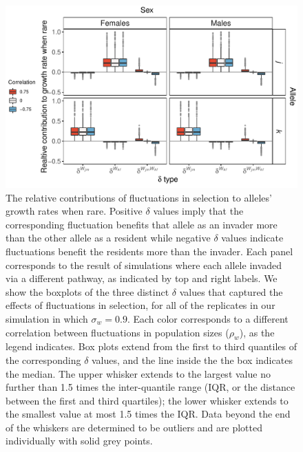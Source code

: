 \documentclass[12pt]{article}
\begin{document}
\begin{figure}[H]
  \centerline{\includegraphics[]{box_plots_selection.pdf}}
  \caption{The relative contributions of fluctuations in selection to alleles' growth rates when rare. Positive $\delta$ values imply that the corresponding fluctuation benefits that allele as an invader more than the other allele as a resident while negative $\delta$ values indicate fluctuations benefit the residents more than the invader. Each panel corresponds to the result of simulations where each allele invaded via a different pathway, as indicated by top and right labels. We show the boxplots of the three distinct $\delta$ values that captured the effects of fluctuations in selection, for all of the replicates in our simulation in which $\sigma_{w}=0.9$. Each color corresponds to a different correlation between fluctuations in population sizes ($\rho_{w}$), as the legend indicates. Box plots extend from the first to third quantiles of the corresponding $\delta$ values, and the line inside the the box indicates the median. The upper whisker extends to the largest value no further than 1.5 times the inter-quantile range (IQR, or the distance between the first and third quartiles); the lower whisker extends to the smallest value at most 1.5 times the IQR. Data beyond the end of the whiskers are determined to be outliers and are plotted individually with solid grey points. }
    \label{fig:boxes_selection}
\end{figure}

\clearpage


\end{document}
